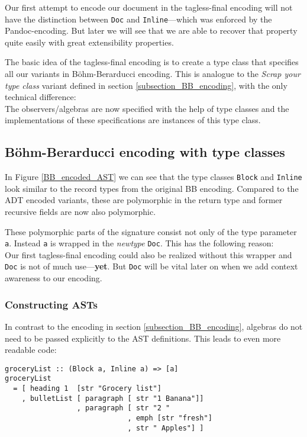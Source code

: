 Our first attempt to encode our document in the tagless-final encoding will not
have the distinction between \texttt{Doc} and \texttt{Inline}—which was enforced
by the Pandoc-encoding. But later we will see that we are able to recover that
property quite easily with great extensibility properties.

The basic idea of the tagless-final encoding is to create a type class that
specifies all our variants in Böhm-Berarducci encoding. This is analogue to the
\emph{Scrap your type class} variant defined in section
\ref{subsection_BB_encoding}, with the only technical difference:\\
The observers/algebras are now specified with the help of type classes and the
implementations of these specifications are instances of this type class.

\subsection{Böhm-Berarducci encoding with type classes}

In Figure \ref{BB_encoded_AST} we can see that the type classes \texttt{Block}
and \texttt{Inline} look similar to the record types from the original BB
encoding. Compared to the ADT encoded variants, these are polymorphic in the
return type and former recursive fields are now also polymorphic.

These polymorphic parts of the signature consist not only of the type parameter
\texttt{a}. Instead \texttt{a} is wrapped in the \emph{newtype} \texttt{Doc}.
This has the following reason:\\
Our first tagless-final encoding could also be realized without this wrapper and
\texttt{Doc} is not of much use—\textbf{yet}. But \texttt{Doc} will be vital
later on when we add context awareness to our encoding.

\subsubsection{Constructing ASTs}

In contrast to the encoding in section \ref{subsection_BB_encoding}, algebras do
not need to be passed explicitly to the AST definitions. This leads to even more readable code:

\begin{lstlisting}
groceryList :: (Block a, Inline a) => [a]
groceryList
  = [ heading 1  [str "Grocery list"]
    , bulletList [ paragraph [ str "1 Banana"]]
                 , paragraph [ str "2 "
                             , emph [str "fresh"]
                             , str " Apples"] ]
\end{lstlisting}

